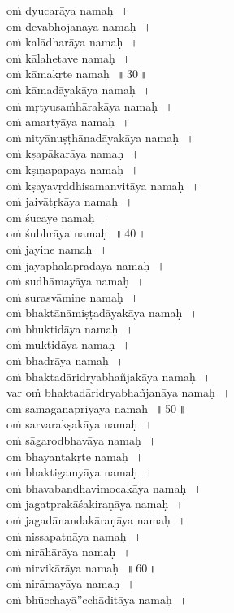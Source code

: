 \documentclass[parskip, DIV=14, pagenumber=head,top]{scrartcl}
\begin{document}
oṁ dyucarāya namaḥ\,~।\\
oṁ devabhojanāya namaḥ\,~।\\
oṁ kalādharāya namaḥ\,~।\\
oṁ kālahetave namaḥ\,~।\\
oṁ kāmakṛte namaḥ\,~॥\,30\,॥\\ 
oṁ kāmadāyakāya namaḥ\,~।\\
oṁ mṛtyusaṁhārakāya namaḥ\,~।\\
oṁ amartyāya namaḥ\,~।\\
oṁ nityānuṣṭhānadāyakāya namaḥ\,~।\\
oṁ kṣapākarāya namaḥ\,~।\\
oṁ kṣīṇapāpāya namaḥ\,~।\\
oṁ kṣayavṛddhisamanvitāya namaḥ\,~।\\
oṁ jaivātṛkāya namaḥ\,~।\\
oṁ śucaye namaḥ\,~।\\
oṁ śubhrāya namaḥ\,~॥\,40\,॥\\ 
oṁ jayine namaḥ\,~।\\
oṁ jayaphalapradāya namaḥ\,~।\\
oṁ sudhāmayāya namaḥ\,~।\\
oṁ surasvāmine namaḥ\,~।\\
oṁ bhaktānāmiṣṭadāyakāya namaḥ\,~।\\
oṁ bhuktidāya namaḥ\,~।\\
oṁ muktidāya namaḥ\,~।\\
oṁ bhadrāya namaḥ\,~।\\
oṁ bhaktadāridryabhañjakāya namaḥ\,~।\\
var  oṁ bhaktadāridryabhañjanāya namaḥ\,~।\\
oṁ sāmagānapriyāya namaḥ\,~॥\,50\,॥\\ 
oṁ sarvarakṣakāya namaḥ\,~।\\
oṁ sāgarodbhavāya namaḥ\,~।\\
oṁ bhayāntakṛte namaḥ\,~।\\
oṁ bhaktigamyāya namaḥ\,~।\\
oṁ bhavabandhavimocakāya namaḥ\,~।\\
oṁ jagatprakāśakiraṇāya namaḥ\,~।\\
oṁ jagadānandakāraṇāya namaḥ\,~।\\
oṁ nissapatnāya namaḥ\,~।\\
oṁ nirāhārāya namaḥ\,~।\\
oṁ nirvikārāya namaḥ\,~॥\,60\,॥\\ 
oṁ nirāmayāya namaḥ\,~।\\
oṁ bhūcchayā''cchāditāya namaḥ\,~।\\
\end{document}
